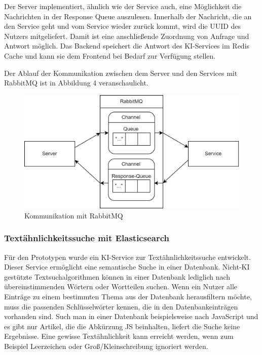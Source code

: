 Der Server implementiert, ähnlich wie der Service auch, eine Möglichkeit die Nachrichten in der Response Queue auszulesen. Innerhalb der Nachricht, die an den Service geht und vom Service wieder zurück kommt, wird die UUID des Nutzers mitgeliefert. Damit ist eine anschließende Zuordnung von Anfrage und Antwort möglich. Das Backend speichert die Antwort des KI-Services im Redis Cache und kann sie dem Frontend bei Bedarf zur Verfügung stellen.

Der Ablauf der Kommunikation zwischen dem Server und den Services mit RabbitMQ ist in Abbildung 4 veranschaulicht. 
\begin{figure}[H]
  \centering
    \includegraphics[width = 15cm]{bilder/Rabbit3}
    \caption{Kommunikation mit RabbitMQ}
\end{figure}

\subsubsection{Textähnlichkeitssuche mit Elasticsearch}

Für den Prototypen wurde ein KI-Service zur Textähnlichkeitssuche entwickelt. Dieser Service ermöglicht eine semantische Suche in einer Datenbank. Nicht-KI gestützte Textsuchalgorithmen können in einer Datenbank lediglich nach übereinstimmenden Wörtern oder Wortteilen suchen. Wenn ein Nutzer alle Einträge zu einem bestimmten Thema aus der Datenbank herausfiltern möchte, muss die passenden Schlüsselwörter kennen, die in den Datenbankeinträgen vorhanden sind. Such man in einer Datenbank beispielsweise nach \glqq JavaScript\grqq{} und es gibt nur Artikel, die die Abkürzung \glqq JS\grqq{} beinhalten, liefert die Suche keine Ergebnisse. Eine gewisse Textähnlichkeit kann erreicht werden, wenn zum Beispiel Leerzeichen oder Groß/Kleinschreibung ignoriert werden. 

